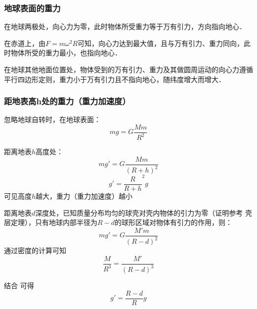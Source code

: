 \subsubsection{地球表面的重力}

在地球两极处，向心力为零，此时物体所受重力等于万有引力，方向指向地心．

在赤道上，由$F=m\omega^2R$可知，向心力达到最大值，且与万有引力、重力同向，此时物体所受的重力最小，也指向地心．

在地球其他地面位置处，物体受到的万有引力、重力及其做圆周运动的向心力遵循平行四边形定则，重力小于万有引力且不指向地心，随纬度增大而增大．

\subsubsection{距地表高h处的重力（重力加速度）}

忽略地球自转时，在地球表面：
\begin{equation}
mg=G\frac{Mm}{R^2}
\end{equation}

距离地表$h$高度处：
\begin{equation}
mg'=G\frac{Mm}{(R+h)^2}
\end{equation}
\begin{equation}
g'=\frac{R}{R+h}^2g
\end{equation}
可见高度$h$越大，重力（重力加速度）越小

距离地表$d$深度处，已知质量分布均匀的球壳对壳内物体的引力为零（证明参考 壳层定理），只有地球内部半径为$R-d$的球形区域对物体有引力的作用，则：
\begin{equation}
mg'=G\frac{M'm}{(R-d)^2}
\end{equation}
通过密度的计算可知
\begin{equation}
\frac{M}{R^3}=\frac{M'}{(R-d)^3}
\end{equation}

结合 可得
\begin{equation}
g'=\frac{R-d}{R}g
\end{equation}
